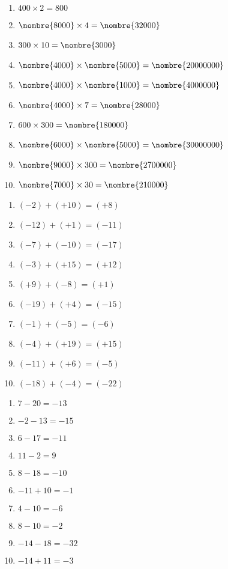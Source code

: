 \documentclass[a4paper,11pt,fleqn]{article}
\begin{document}
\newpage
{}
\begin{correction}\exo{}

\begin{multicols}{2}
\begin{enumerate}
	\item $ 400 \times 2 = 800 $
	\item $ \nombre{8000} \times 4 = \nombre{32000} $
	\item $ 300 \times 10 = \nombre{3000} $
	\item $ \nombre{4000} \times \nombre{5000} = \nombre{20000000} $
	\item $ \nombre{4000} \times \nombre{1000} = \nombre{4000000} $
	\item $ \nombre{4000} \times 7 = \nombre{28000} $
	\item $ 600 \times 300 = \nombre{180000} $
	\item $ \nombre{6000} \times \nombre{5000} = \nombre{30000000} $
	\item $ \nombre{9000} \times 300 = \nombre{2700000} $
	\item $ \nombre{7000} \times 30 = \nombre{210000} $
\end{enumerate}
\end{multicols}

\exo{}

\begin{multicols}{2}
\begin{enumerate}
	\item $ (-2) + (+10) = (+8) $
	\item $ (-12) + (+1) = (-11) $
	\item $ (-7) + (-10) = (-17) $
	\item $ (-3) + (+15) = (+12) $
	\item $ (+9) + (-8) = (+1) $
	\item $ (-19) + (+4) = (-15) $
	\item $ (-1) + (-5) = (-6) $
	\item $ (-4) + (+19) = (+15) $
	\item $ (-11) + (+6) = (-5) $
	\item $ (-18) + (-4) = (-22) $
\end{enumerate}
\end{multicols}

\exo{}

\begin{multicols}{2}
\begin{enumerate}
	\item $ 7-20 = -13 $
	\item $ -2-13 = -15 $
	\item $ 6-17 = -11 $
	\item $ 11-2 = 9 $
	\item $ 8-18 = -10 $
	\item $ -11+10 = -1 $
	\item $ 4-10 = -6 $
	\item $ 8-10 = -2 $
	\item $ -14-18 = -32 $
	\item $ -14+11 = -3 $
\end{enumerate}
\end{multicols}


\end{correction}
\end{document}
